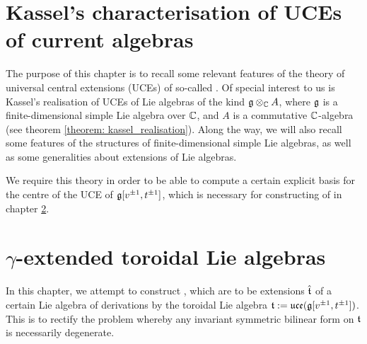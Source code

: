     \chapter{Kassel's characterisation of UCEs of current algebras} \label{chapter: kassel_UCEs}
        \begin{summary}
            The purpose of this chapter is to recall some relevant features of the theory of universal central extensions (UCEs) of so-called . Of special interest to us is Kassel's realisation of UCEs of Lie algebras of the kind $\g \tensor_{\bbC} A$, where $\mathfrak{g}$ is a finite-dimensional simple Lie algebra over $\mathbb{C}$, and $A$ is a commutative $\mathbb{C}$-algebra (see theorem \ref{theorem: kassel_realisation}). Along the way, we will also recall some features of the structures of finite-dimensional simple Lie algebras, as well as some generalities about extensions of Lie algebras.
            
            We require this theory in order to be able to compute a certain explicit basis for the centre of the UCE of $\mathfrak{g}[v^{\pm 1}, t^{\pm 1}]$, which is necessary for constructing of  in chapter \ref{chapter: yangian_EALAs}. 
        \end{summary}

        \minitoc

        \newpage
    
        
        
        \newpage
        
        
        
        \newpage
        
        

    \newpage

    \chapter{\texorpdfstring{$\gamma$}{}-extended toroidal Lie algebras} \label{chapter: yangian_EALAs}
        \begin{summary}
            In this chapter, we attempt to construct , which are to be extensions $\hat{\mathfrak{t}}$ of a certain Lie algebra of derivations by the toroidal Lie algebra $\mathfrak{t} := \mathfrak{uce}(\mathfrak{g}[v^{\pm 1}, t^{\pm 1}])$. This is to rectify the problem whereby any invariant symmetric bilinear form on $\mathfrak{t}$ is necessarily degenerate.
        \end{summary}

